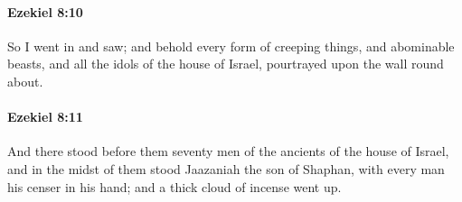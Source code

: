 		\paragraph{Ezekiel 8:10} %
			\label{EZEKIEL-8-10}

			So I went in and saw; and behold every form of creeping things, and abominable beasts, and all the idols of the house of Israel, pourtrayed upon the wall round about.


		\paragraph{Ezekiel 8:11} %
			\label{EZEKIEL-8-11}

			And there stood before them seventy men of the ancients of the house of Israel, and in the midst of them stood Jaazaniah the son of Shaphan, with every man his censer in his hand; and a thick cloud of incense went up.

